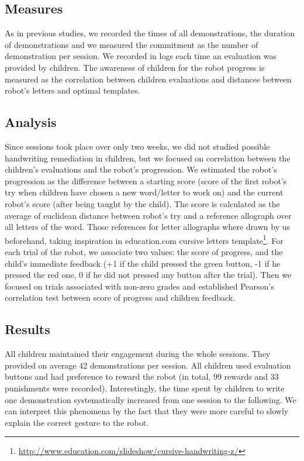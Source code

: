 \documentclass[conference]{IEEEtran}
\begin{document}
\subsection{Measures}

As in previous studies, we recorded the times of all demonstrations, the duration of demonstrations and we measured the commitment as the number of demonstration per session. 
We recorded in logs each time an evaluation was provided by children. The awareness of children for the robot progress is measured as the correlation between children evaluations and distances between robot's letters and optimal templates.

\subsection{Analysis}

Since sessions took place over only two weeks, we did not studied possible
handwriting remediation in children, but we focused on correlation between the children's evaluations and the robot's progression.
We estimated the robot's progression as the difference between a starting score
(score of the first robot's try when children have chosen a new word/letter to
work on) and the current robot's score (after being taught by the child). The
score is calculated as the average of euclidean
distance between robot's try and a reference allograph over all letters of the
word. Those references for letter allographs where drawn by us beforehand, taking inspiration in education.com cursive letters template\footnote{\url{http://www.education.com/slideshow/cursive-handwriting-z/}}. For each trial of the robot, we associate two values: the score of progress, and the child's immediate feedback (+1 if the child pressed the green button, -1 if he pressed the red one, 0 if he did not pressed any button after the trial). Then we focused on trials associated with non-zero grades and established Pearson's correlation test between score of progress and children feedback.

\subsection{Results}

All children maintained their engagement during the whole sessions. They provided
on average 42 demonstrations per session. All children used evaluation buttons and
had preference to reward the robot (in total, 99 rewards and 33 punishments were recorded). Interestingly, the time spent by children to write one demonstration systematically increased from one session to the following. We can interpret this phenomena by the fact that they were more careful to slowly explain the correct gesture to the robot. 
\end{document}
